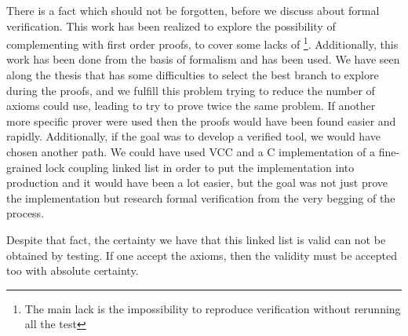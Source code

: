 There is a fact which should not be forgotten, before we discuss about formal verification. 
%
This work has been realized to explore the possibility of complementing \leap with first order proofs, to cover some lacks of \leap
\footnote{The main lack is the impossibility to reproduce verification without rerunning all the test}.
%
Additionally, this work has been done from the basis of formalism and \spass has been used. 
%
We have seen along the thesis that \spass has some difficulties to select the best branch to explore during the proofs, and we fulfill this problem trying to reduce the number of axioms \spass could use, leading to try to prove twice the same problem. 
%
If another more specific prover were used then the proofs would have been found easier and rapidly.
%
Additionally, if the goal was to develop a verified tool, we would have chosen another path. 
%
We could have used \gls{VCC} and a C implementation of a fine-grained lock coupling linked list in order to put the implementation into production and it would have been a lot easier, but the goal was not just prove the implementation but research formal verification from the very begging of the process.


Despite that fact, the certainty we have that this linked list is valid can not be obtained by testing. 
%
If one accept the axioms, then the validity must be accepted too with absolute certainty.
